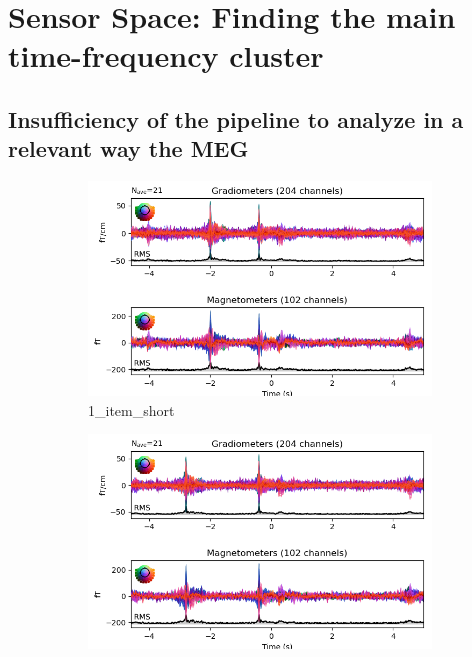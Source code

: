 
\section{Sensor Space: Finding the main time-frequency cluster}

\subsection{Insufficiency of the pipeline to analyze in a relevant way the MEG}

\begin{figure}[htb]
    \centering %
    \begin{subfigure}{0.25\textwidth}
        \includegraphics[width=\linewidth]{images_report/sensor/evoked/1_item_short.png}
        \caption{1\_item\_short}
        \label{fig:1_item_short}
    \end{subfigure}\hfil %
    \begin{subfigure}{0.25\textwidth}
        \includegraphics[width=\linewidth]{images_report/sensor/evoked/1_item_medium.png}

\end{subfigure}
\end{figure}
